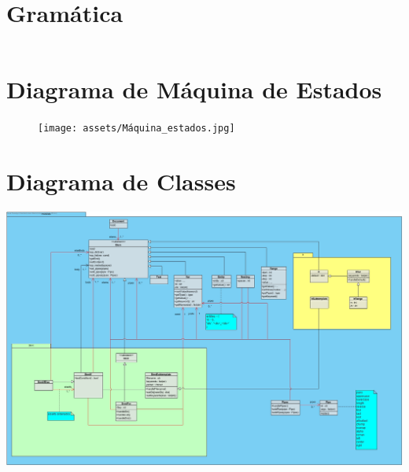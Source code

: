 \documentclass[11pt]{report}
\begin{document}
\section{Gramática} \label{fig:grammar}
\inputminted{bash}{assets/gramatica.txt}

\section{Diagrama de Máquina de Estados}
\begin{figure}[!ht]
    \centering
    \texttt{[image: assets/Máquina\_estados.jpg]}
\end{figure}

\section{Diagrama de Classes} \label{sec:classes}
\begin{landscape}
    \centering
    \includegraphics[width=\linewidth]{assets/class_diagram.jpg}
\end{landscape}
%
%
%
% 
% 


\end{document}
